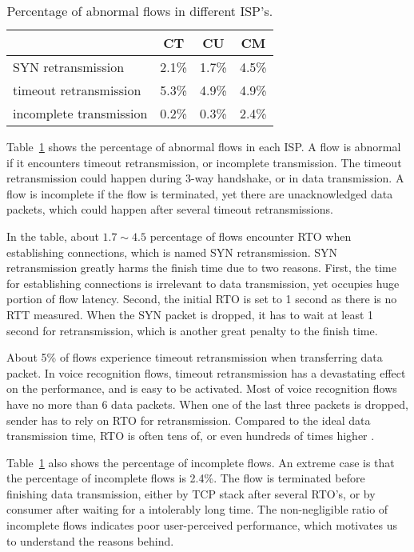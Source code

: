 \begin{table}[th]
\centering
\renewcommand{\arraystretch}{1.2}
\caption{Percentage of abnormal flows in different ISP's.}
\label{tab:voice_stats}
\begin{tabular}{l|c|c|c}
	\toprule
	 & CT & CU & CM \\
	\midrule
	SYN retransmission & 2.1\% & 1.7\% & 4.5\% \\
	\hline
	timeout retransmission & 5.3\% & 4.9\% & 4.9\% \\
	\hline
	incomplete transmission & 0.2\% & 0.3\% & 2.4\% \\
	\bottomrule
\end{tabular}
\end{table}

Table~\ref{tab:voice_stats} shows the percentage of abnormal flows in each ISP. A flow is abnormal if it encounters timeout retransmission, or incomplete transmission. The timeout retransmission could happen during 3-way handshake, or in data transmission. A flow is incomplete if the flow is terminated, yet there are unacknowledged data packets, which could happen after several timeout retransmissions.

In the table, about $1.7\sim4.5$ percentage of flows encounter RTO when establishing connections, which is named SYN retransmission. SYN retransmission greatly harms the finish time due to two reasons. First, the time for establishing connections is irrelevant to data transmission, yet occupies huge portion of flow latency. Second, the initial RTO is set to 1 second \cite{rfc62982011computing} as there is no RTT measured. When the SYN packet is dropped, it has to wait at least 1 second for retransmission, which is another great penalty to the finish time.

About 5\% of flows experience timeout retransmission when transferring data packet. In voice recognition flows, timeout retransmission has a devastating effect on the performance, and is easy to be activated. Most of voice recognition flows have no more than 6 data packets. When one of the last three packets is dropped, sender has to rely on RTO for retransmission. Compared to the ideal data transmission time, RTO is often tens of, or even hundreds of times higher \cite{flach2013reducing}.

Table~\ref{tab:voice_stats} also shows the percentage of incomplete flows. An extreme case is that the percentage of incomplete flows is 2.4\%. The flow is terminated before finishing data transmission, either by TCP stack after several RTO's, or by consumer after waiting for a intolerably long time. The non-negligible ratio of incomplete flows indicates poor user-perceived performance, which motivates us to understand the reasons behind.


